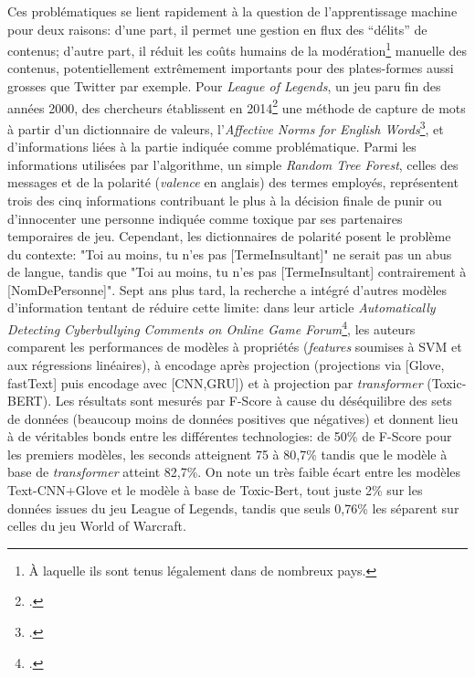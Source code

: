 Ces problématiques se lient rapidement à la question de l'apprentissage machine pour deux raisons: d'une part, il permet une gestion en flux des \enquote{délits} de contenus; d'autre part, il réduit les coûts humains de la modération\footnote{À laquelle ils sont tenus légalement dans de nombreux pays.} manuelle des contenus, potentiellement extrêmement importants pour des plates-formes aussi grosses que Twitter par exemple. Pour \textit{League of Legends}, un jeu paru fin des années 2000, des chercheurs établissent en 2014\footcite{blackburn_stfu_2014} une méthode de capture de mots à partir d'un dictionnaire de valeurs, l'\textit{Affective Norms for English Words}\footcite{bradley_affective_1999}, et d'informations liées à la partie indiquée comme problématique. Parmi les informations utilisées par l'algorithme, un simple \textit{Random Tree Forest}, celles des messages et de la polarité (\textit{valence} en anglais) des termes employés, représentent trois des cinq informations contribuant le plus à la décision finale de punir ou d'innocenter une personne indiquée comme toxique par ses partenaires temporaires de jeu. Cependant, les dictionnaires de polarité posent le problème du contexte: "Toi au moins, tu n'es pas [TermeInsultant]" ne serait pas un abus de langue, tandis que "Toi au moins, tu n'es pas [TermeInsultant] contrairement à [NomDePersonne]". Sept ans plus tard, la recherche a intégré d'autres modèles d'information tentant de réduire cette limite: dans leur article \textit{Automatically Detecting Cyberbullying Comments on Online Game Forum}\footcite{vo_automatically_2021}, les auteurs comparent les performances de modèles à propriétés (\textit{features} soumises à SVM et aux régressions linéaires), à encodage après projection (projections via [Glove, fastText] puis encodage avec [CNN,GRU]) et à projection par \textit{transformer} (Toxic-BERT). Les résultats sont mesurés par F-Score à cause du déséquilibre des sets de données (beaucoup moins de données positives que négatives) et donnent lieu à de véritables bonds entre les différentes technologies: de 50\% de F-Score pour les premiers modèles, les seconds atteignent 75 à 80,7\% tandis que le modèle à base de \textit{transformer} atteint 82,7\%. On note un très faible écart entre les modèles Text-CNN+Glove et le modèle à base de Toxic-Bert, tout juste 2\% sur les données issues du jeu League of Legends, tandis que seuls 0,76\% les séparent sur celles du jeu World of Warcraft.

